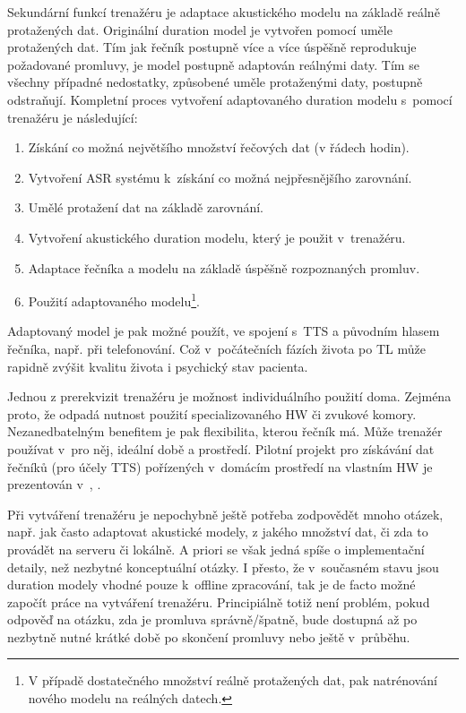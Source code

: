 Sekundární funkcí trenažéru je adaptace akustického modelu na základě reálně protažených dat. Originální duration model je vytvořen pomocí uměle protažených dat. Tím jak řečník postupně více a více úspěšně reprodukuje požadované promluvy, je model postupně adaptován reálnými daty. Tím se všechny případné nedostatky, způsobené uměle protaženými daty, postupně odstraňují. Kompletní proces vytvoření adaptovaného duration modelu s~pomocí trenažéru je následující:

\begin{enumerate}
  \item Získání co možná největšího množství řečových dat (v řádech hodin).
  \item Vytvoření ASR systému  k~získání co možná nejpřesnějšího zarovnání.
  \item Umělé protažení dat na základě zarovnání.
  \item Vytvoření akustického duration modelu, který je použit v~trenažéru.
  \item Adaptace řečníka a modelu na základě úspěšně rozpoznaných promluv.
  \item Použití adaptovaného modelu\footnote{V případě dostatečného množství reálně protažených dat, pak natrénování nového modelu na reálných datech.}.
\end{enumerate}

\noindent Adaptovaný model je pak možné použít, ve spojení s~TTS a původním hlasem řečníka, např. při telefonování. Což v~počátečních fázích života po TL může rapidně zvýšit kvalitu života i psychický stav pacienta. \cite{Mertl2018}

Jednou z prerekvizit trenažéru je možnost individuálního použití doma. Zejména proto, že odpadá nutnost použití specializovaného HW  či zvukové komory. Nezanedbatelným benefitem je pak flexibilita, kterou řečník má. Může trenažér používat v~pro něj, ideální době a prostředí. Pilotní projekt pro získávání dat řečníků (pro účely TTS) pořízených v~domácím prostředí na vlastním HW je prezentován v~\cite{Juzova2015}, \cite{Juzova2017}.

Při vytváření trenažéru je nepochybně ještě potřeba zodpovědět mnoho otázek,  např. jak často adaptovat akustické modely, z jakého množství dat, či zda to provádět na serveru či lokálně. A priori se však jedná spíše o implementační detaily, než nezbytné konceptuální otázky. I přesto, že v~současném stavu jsou duration modely vhodné pouze  k~offline zpracování, tak je de facto možné započít práce na vytváření trenažéru. Principiálně totiž není problém, pokud odpověď na otázku, zda je promluva správně/špatně, bude dostupná až po nezbytně nutné krátké době po skončení promluvy nebo ještě v~průběhu.

